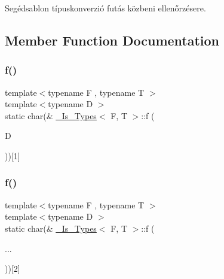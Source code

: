 Segédsablon típuskonverzió futás közbeni ellenőrzésere. 

\subsection{Member Function Documentation}
\mbox{\label{struct___is___types_a56e08a2768c571caab81e9bc47d5acc6}} 
\subsubsection{\texorpdfstring{f()}{f()}\hspace{0.1cm}{\footnotesize\ttfamily [1/2]}}
{\footnotesize\ttfamily template$<$typename F , typename T $>$ \\
template$<$typename D $>$ \\
static char(\& \hyperlink{struct___is___types}{\+\_\+\+Is\+\_\+\+Types}$<$ F, T $>$\+::f (\begin{DoxyParamCaption}\item[{D}]{ }\end{DoxyParamCaption}))\mbox{[}1\mbox{]}\hspace{0.3cm}{\ttfamily [static]}}

\mbox{\label{struct___is___types_a013da65c5a92e9bd02f5d361c10d376d}} 
\subsubsection{\texorpdfstring{f()}{f()}\hspace{0.1cm}{\footnotesize\ttfamily [2/2]}}
{\footnotesize\ttfamily template$<$typename F , typename T $>$ \\
template$<$typename D $>$ \\
static char(\& \hyperlink{struct___is___types}{\+\_\+\+Is\+\_\+\+Types}$<$ F, T $>$\+::f (\begin{DoxyParamCaption}\item[{}]{... }\end{DoxyParamCaption}))\mbox{[}2\mbox{]}\hspace{0.3cm}{\ttfamily [static]}}



